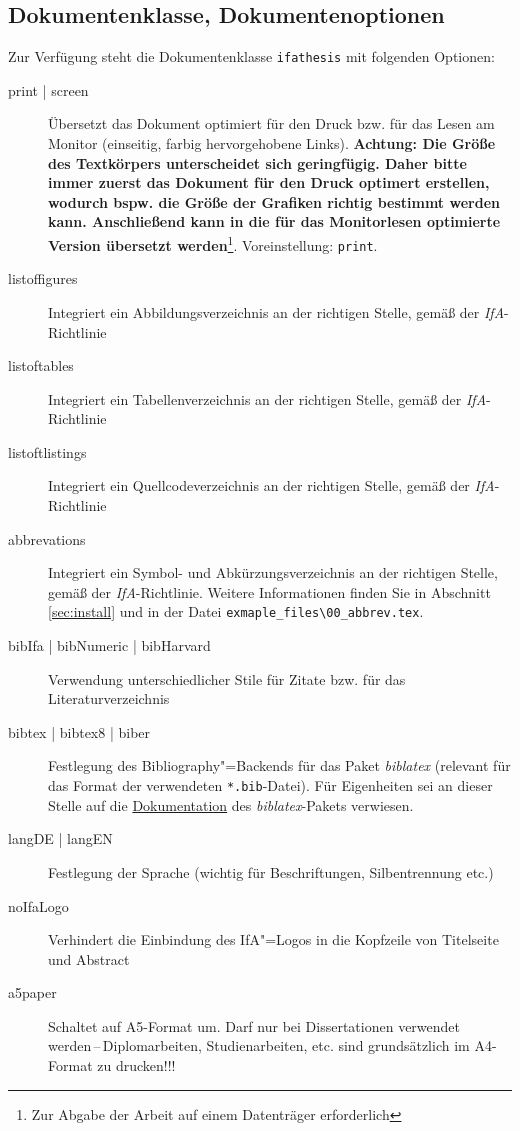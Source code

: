 \subsection{Dokumentenklasse, Dokumentenoptionen}

Zur Verfügung steht die Dokumentenklasse \verb-ifathesis- mit folgenden Optionen:

\begin{description}
  \item[print | screen] Übersetzt das Dokument optimiert für den Druck bzw. für das Lesen am Monitor (einseitig, farbig hervorgehobene Links). \textbf{Achtung: Die Größe des Textkörpers unterscheidet sich geringfügig. Daher bitte immer zuerst das Dokument für den Druck optimert erstellen, wodurch bspw. die Größe der Grafiken richtig bestimmt werden kann. Anschließend kann in die für das Monitorlesen optimierte Version übersetzt werden}\footnote{Zur Abgabe der Arbeit auf einem Datenträger erforderlich}. Voreinstellung: \verb-print-.
  \item[listoffigures] Integriert ein Abbildungsverzeichnis an der richtigen Stelle, gemäß der \emph{IfA}-Richtlinie
  \item[listoftables] Integriert ein Tabellenverzeichnis an der richtigen Stelle, gemäß der \emph{IfA}-Richtlinie
  \item[listoftlistings] Integriert ein Quellcodeverzeichnis an der richtigen Stelle, gemäß der \emph{IfA}-Richtlinie
  \item[abbrevations] Integriert ein Symbol- und Abkürzungsverzeichnis an der richtigen Stelle, gemäß der \emph{IfA}-Richtlinie. Weitere Informationen finden Sie in Abschnitt \ref{sec:install} und in der Datei \verb-exmaple_files\00_abbrev.tex-.
  \item[bibIfa | bibNumeric | bibHarvard] Verwendung unterschiedlicher Stile für
  Zitate bzw. für das Literaturverzeichnis
  \item[bibtex | bibtex8 | biber] Festlegung des Bibliography"=Backends für das Paket \emph{biblatex} (relevant für das Format der verwendeten \texttt{*.bib}-Datei). Für Eigenheiten sei an dieser Stelle auf die \href{https://www.ctan.org/pkg/biblatex?lang=de}{Dokumentation} des \emph{biblatex}-Pakets verwiesen.
  \item[langDE | langEN] Festlegung der Sprache (wichtig für Beschriftungen, Silbentrennung etc.)
  \item[noIfaLogo] Verhindert die Einbindung des IfA"=Logos in die Kopfzeile von Titelseite und Abstract
  \item[a5paper] Schaltet auf A5-Format um. Darf nur bei Dissertationen verwendet werden\,--\,Diplomarbeiten, Studienarbeiten, etc. sind grundsätzlich im A4-Format zu drucken!!!
\end{description}


